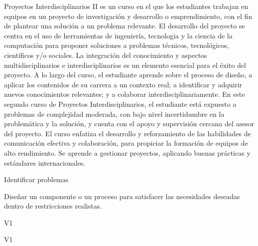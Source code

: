 \begin{syllabus}


\begin{justification}
Proyectos Interdisciplinarios II es un curso en el que los estudiantes trabajan en equipos en un proyecto de investigación y desarrollo o emprendimiento, con el fin de plantear una solución a un problema relevante. El desarrollo del proyecto se centra en el uso de herramientas de ingeniería, tecnologia y la ciencia de la computación para proponer soluciones a problemas técnicos, tecnológicos, científicos y/o sociales. La integración del
conocimiento y aspectos multidisciplinarios e interdisciplinarios es un elemento esencial para el éxito del proyecto. A lo largo del curso, el estudiante aprende sobre el proceso de
diseño, a aplicar los contenidos de su carrera a un contexto real; a identificar y adquirir nuevos conocimientos relevantes; y a colaborar interdisciplinariamente. En este segundo curso de Proyectos Interdisciplinarios, el estudiante está expuesto a problemas de complejidad moderada, con bajo nivel incertidumbre en la problemática y la solución, y cuenta con el
apoyo y supervisión cercana del asesor del proyecto. El curso enfatiza el desarrollo y reforzamiento de las habilidades de comunicación efectiva y colaboración, para propiciar la
formación de equipos de alto rendimiento. Se aprende a gestionar proyectos, aplicando buenas prácticas y estándares internacionales.
\end{justification}

\begin{goals}
   \item Identificar problemas
   \item Diseñar un componente o un proceso para satisfacer las necesidades deseadas dentro de restricciones realistas. 
\end{goals}

\begin{outcomes}{V1}
   \item {}
   \item {}
\end{outcomes}

\begin{competences}{V1}
    \item {}
    \item {}
\end{competences}


\end{syllabus}
